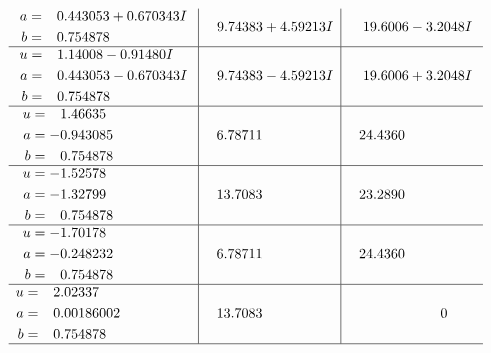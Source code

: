 \documentclass[1p]{elsarticle_modified}
\theoremstyle{definition}
\begin{document}
$$\begin{array}{c|c|c}
\begin{aligned}
a &= \phantom{-}0.443053 + 0.670343 I \\
b &= \phantom{-}0.754878\phantom{ +0.000000I}\end{aligned}
 & \phantom{-}9.74383 + 4.59213 I & \phantom{-}19.6006 - 3.2048 I \\ \hline\begin{aligned}
u &= \phantom{-}1.14008 - 0.91480 I \\
a &= \phantom{-}0.443053 - 0.670343 I \\
b &= \phantom{-}0.754878\phantom{ +0.000000I}\end{aligned}
 & \phantom{-}9.74383 - 4.59213 I & \phantom{-}19.6006 + 3.2048 I \\ \hline\begin{aligned}
u &= \phantom{-}1.46635\phantom{ +0.000000I} \\
a &= -0.943085\phantom{ +0.000000I} \\
b &= \phantom{-}0.754878\phantom{ +0.000000I}\end{aligned}
 & \phantom{-}6.78711\phantom{ +0.000000I} & \phantom{-}24.4360\phantom{ +0.000000I} \\ \hline\begin{aligned}
u &= -1.52578\phantom{ +0.000000I} \\
a &= -1.32799\phantom{ +0.000000I} \\
b &= \phantom{-}0.754878\phantom{ +0.000000I}\end{aligned}
 & \phantom{-}13.7083\phantom{ +0.000000I} & \phantom{-}23.2890\phantom{ +0.000000I} \\ \hline\begin{aligned}
u &= -1.70178\phantom{ +0.000000I} \\
a &= -0.248232\phantom{ +0.000000I} \\
b &= \phantom{-}0.754878\phantom{ +0.000000I}\end{aligned}
 & \phantom{-}6.78711\phantom{ +0.000000I} & \phantom{-}24.4360\phantom{ +0.000000I} \\ \hline\begin{aligned}
u &= \phantom{-}2.02337\phantom{ +0.000000I} \\
a &= \phantom{-}0.00186002\phantom{ +0.000000I} \\
b &= \phantom{-}0.754878\phantom{ +0.000000I}\end{aligned}
 & \phantom{-}13.7083\phantom{ +0.000000I} & \phantom{-0.000000 } 0\\
 \hline 
 \end{array}$$\newpage\newpage\renewcommand{\arraystretch}{1}
\end{document}
